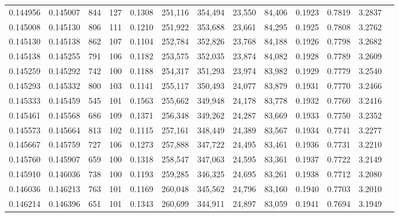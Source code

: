 \begin{tabular}{rrrrrrrrrrrrr}
0.144956 & 0.145007 &   844 & 127 &                                     0.1308 & 251,116 & 354,494 &  23,550 &  84,406 & 0.1923 & 0.7819 & 3.2837 \\
0.145008 & 0.145130 &   806 & 111 &                                     0.1210 & 251,922 & 353,688 &  23,661 &  84,295 & 0.1925 & 0.7808 & 3.2762 \\
0.145130 & 0.145138 &   862 & 107 &                                     0.1104 & 252,784 & 352,826 &  23,768 &  84,188 & 0.1926 & 0.7798 & 3.2682 \\
0.145138 & 0.145255 &   791 & 106 &                                     0.1182 & 253,575 & 352,035 &  23,874 &  84,082 & 0.1928 & 0.7789 & 3.2609 \\
0.145259 & 0.145292 &   742 & 100 &                                     0.1188 & 254,317 & 351,293 &  23,974 &  83,982 & 0.1929 & 0.7779 & 3.2540 \\
0.145293 & 0.145332 &   800 & 103 &                                     0.1141 & 255,117 & 350,493 &  24,077 &  83,879 & 0.1931 & 0.7770 & 3.2466 \\
0.145333 & 0.145459 &   545 & 101 &                                     0.1563 & 255,662 & 349,948 &  24,178 &  83,778 & 0.1932 & 0.7760 & 3.2416 \\
0.145461 & 0.145568 &   686 & 109 &                                     0.1371 & 256,348 & 349,262 &  24,287 &  83,669 & 0.1933 & 0.7750 & 3.2352 \\
0.145573 & 0.145664 &   813 & 102 &                                     0.1115 & 257,161 & 348,449 &  24,389 &  83,567 & 0.1934 & 0.7741 & 3.2277 \\
0.145667 & 0.145759 &   727 & 106 &                                     0.1273 & 257,888 & 347,722 &  24,495 &  83,461 & 0.1936 & 0.7731 & 3.2210 \\
0.145760 & 0.145907 &   659 & 100 &                                     0.1318 & 258,547 & 347,063 &  24,595 &  83,361 & 0.1937 & 0.7722 & 3.2149 \\
0.145910 & 0.146036 &   738 & 100 &                                     0.1193 & 259,285 & 346,325 &  24,695 &  83,261 & 0.1938 & 0.7712 & 3.2080 \\
0.146036 & 0.146213 &   763 & 101 &                                     0.1169 & 260,048 & 345,562 &  24,796 &  83,160 & 0.1940 & 0.7703 & 3.2010 \\
0.146214 & 0.146396 &   651 & 101 &                                     0.1343 & 260,699 & 344,911 &  24,897 &  83,059 & 0.1941 & 0.7694 & 3.1949 \\

\end{tabular}
